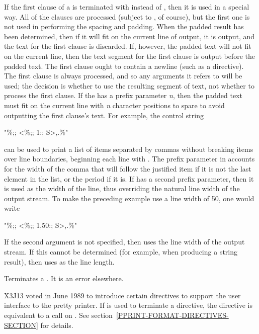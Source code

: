 \begin{flushdesc}
If the first clause of a \cd{{\Xtilde}<} is terminated with \cd{{\Xtilde}:;} instead of
\cd{{\Xtilde};}, then it is used in a special way.  All of the clauses are
processed (subject to \cd{{\Xtilde}{\Xcircumflex}}, of course), but the first one is not used
in performing the spacing and padding.  When the padded result has been
determined, then if it will fit on the current line of output, it is
output, and the text for the first clause is discarded.  If, however, the
padded text will not fit on the current line, then the text segment for
the first clause is output before the padded text.  The first clause
ought to contain a newline (such as a \cd{{\Xtilde}\%} directive).  The first
clause is always processed, and so any arguments it refers to will be
used; the decision is whether to use the resulting segment of text, not
whether to process the first clause.  If the \cd{{\Xtilde}:;} has a prefix
parameter {\it n}, then the padded text must fit on the current line with
{\it n} character positions to spare to avoid outputting the first clause's
text.  For example, the control string
\begin{lisp}
"{\Xtilde}\%;; {\Xtilde}{\Xlbrace}{\Xtilde}<{\Xtilde}\%;; {\Xtilde}1:; {\Xtilde}S{\Xtilde}>{\Xtilde}{\Xcircumflex},{\Xtilde}{\Xrbrace}.{\Xtilde}\%"
\end{lisp}
can be used to print a list of items separated by commas without
breaking items over line boundaries, beginning each line with
\cd{;; }.  The prefix parameter  in  accounts for the width of the
comma that will follow the justified item if it is not the last
element in the list, or the period if it is.  If \cd{{\Xtilde}:;} has a second
prefix parameter, then it is used as the width of the line,
thus overriding the natural line width of the output stream.  To make
the preceding example use a line width of 50, one would write
\begin{lisp}
"{\Xtilde}\%;; {\Xtilde}{\Xlbrace}{\Xtilde}<{\Xtilde}\%;; {\Xtilde}1,50:; {\Xtilde}S{\Xtilde}>{\Xtilde}{\Xcircumflex},{\Xtilde}{\Xrbrace}.{\Xtilde}\%"
\end{lisp}

If the second argument is not specified, then  uses the
line width of the output stream.
If this cannot be determined (for example, when producing a string result),
then  uses  as the line length.

\item[\cd{{\Xtilde}>}]
Terminates a \cd{{\Xtilde}<}.  It is an error elsewhere.
\begin{new}
X3J13 voted in June 1989  to introduce
certain  directives to support the user interface to the pretty
printer.  If \cd{{\Xtilde}:>} is used to terminate a
 directive, the directive is equivalent to a call on
.
See section~\ref{PPRINT-FORMAT-DIRECTIVES-SECTION} for details.
\end{new}


\end{flushdesc}
